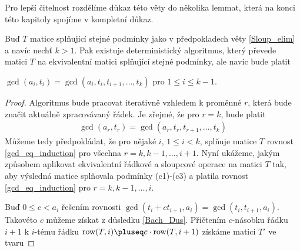Pro lepší čitelnost rozdělíme důkaz této věty do několika lemmat, která na konci
této kapitoly spojíme v kompletní důkaz.




\begin{lem} \label{Sloup_elim_GCD}
Buď $ T $ matice splňující stejné podmínky jako v předpokladech věty
\ref{Sloup_elim} a navíc nechť $ k > 1 $. Pak existuje deterministický
algoritmus, který převede matici $ T $ na ekvivalentní matici splňující stejné
podmínky, ale navíc bude platit
\begin{Cond}[resume=Sloup_elim_CONDS]
    \item $ \gcd(a_i, t_i) = \gcd(a_i, t_i, t_{i+1},\dots, t_k) $ pro
        $ 1 \leq i \leq k - 1 $.
\end{Cond}
\end{lem}
\begin{proof}
Algoritmus bude pracovat iterativně vzhledem k proměnné $ r $, která bude značit
aktuálně zpracovávaný řádek. Je zřejmé, že pro $ r = k $, bude platit
\begin{align} \label{gcd_eq_induction}
    \gcd(a_r, t_r) = \gcd(a_r, t_r, t_{r+1},\dots, t_k)
\end{align}
Můžeme tedy předpokládat, že pro nějaké $ i $, $ 1 \leq i < k $, splňuje
matice $ T $ rovnost \ref{gcd_eq_induction} pro všechna $ r = k, k-1,\dots, i + 1 $.
Nyní ukážeme, jakým způsobem aplikovat ekvivalentní řádkové a sloupcové operace
na matici $ T $ tak, aby výsledná matice splňovala podmínky (c1)-(c3) a platila
rovnost \ref{gcd_eq_induction} pro $ r = k, k-1,\dots, i $.

Buď $ 0 \leq c < a_i $ řešením rovnosti
$ \gcd(t_i + ct_{i+1}, a_i) = \gcd(t_i, t_{i+1}, a_i) $.
Takovéto $ c $ můžeme získat z důsledku \ref{Bach_Dus}. Přičtením $ c $-násobku
řádku $ i + 1 $ k $ i $-tému řádku $ \operatorname{row}(T, i) \pluseq c \cdot \operatorname{row}(T, i + 1) $
získáme matici $ T' $ ve tvaru


\end{proof}
